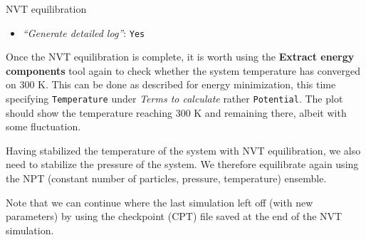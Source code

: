 \documentclass[twocolumn]{bmcart}%
\providecommand{\tightlist}{%
  \setlength{\itemsep}{0pt}\setlength{\parskip}{0pt}}
\begin{document}
\begin{handson_box_colour}{NVT
equilibration}
\begin{itemize}
\begin{itemize}
      \begin{itemize}
      \tightlist
      \item
        \emph{``Bond constraints (constraints)''}:
        \texttt{All\ bonds\ (all-bonds).}
      \item
        \emph{``Temperature /K''}: \texttt{300}
      \item
        \emph{``Step length in ps''}: \texttt{0.0002}
      \item
        \emph{``Number of steps that elapse between saving data points
        (velocities, forces, energies)''}: \texttt{1000}
      \item
        \emph{``Number of steps for the simulation''}: \texttt{50000}
      \end{itemize}
    \end{itemize}
  \item
    \emph{``Generate detailed log''}: \texttt{Yes}
  \end{itemize}

\end{handson_box_colour}

Once the NVT equilibration is complete, it is worth using the \textbf{Extract energy components} tool again to check whether the system temperature has converged on 300 K. This can be done as described for energy minimization, this time specifying \texttt{Temperature} under \emph{Terms to calculate} rather \texttt{Potential}. The plot should show the temperature reaching 300 K and remaining there, albeit with some fluctuation.

Having stabilized the temperature of the system with NVT equilibration,
we also need to stabilize the pressure of the system. We therefore
equilibrate again using the NPT (constant number of particles, pressure,
temperature) ensemble.

Note that we can continue where the last simulation left off (with new
parameters) by using the checkpoint (CPT) file saved at the end of the
NVT simulation.
\end{document}

